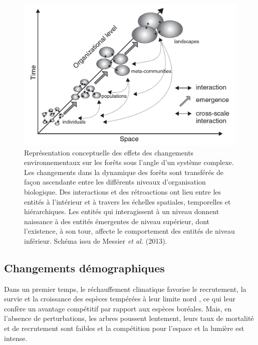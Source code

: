 \begin{figure}
\centering
\includegraphics[width=.9\textwidth]{conclusion/figures/complex.png}
\caption[Représentation conceptuelle des effets des changements environnementaux sur les différents niveaux d'organisation biologique]{Représentation conceptuelle des effets des changements environnementaux sur les forêts sous l'angle d'un système complexe. Les changements dans la dynamique des forêts sont transférés de façon ascendante entre les différents niveaux d'organisation biologique. Des interactions et des rétroactions ont lieu entre les entités à l'intérieur et à travers les échelles spatiales, temporelles et hiérarchiques. Les entités qui interagissent à un niveau donnent naissance à des entités émergentes de niveau supérieur, dont l'existence, à son tour, affecte le comportement des entités de niveau inférieur. Schéma issu de Messier \emph{et al.} (2013).}
\label{fig4.2}
\end{figure}

\hypertarget{changements-duxe9mographiques}{%
\subsection{Changements
démographiques}\label{changements-duxe9mographiques}}

Dans un premier temps, le réchauffement climatique favorise le
recrutement, la survie et la croissance des espèces tempérées à leur
limite nord
\citep{fisichelli_temperate_2014, boisvertmarsh_divergent_2019, goldblum_tree_2005, grundmann_impact_2011, bolte_understory_2014},
ce qui leur confère un avantage compétitif par rapport aux espèces
boréales. Mais, en l'absence de perturbations, les arbres poussent
lentement, leurs taux de mortalité et de recrutement sont faibles et la
compétition pour l'espace et la lumière est intense.

